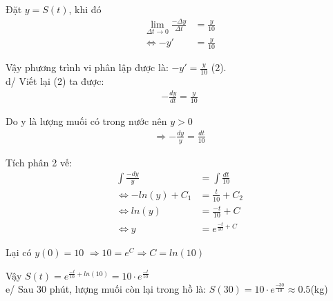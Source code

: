 \documentclass[a4paper,12pt]{report}
\begin{document}
Đặt $y = S(t)$, khi đó
\begin{align*}
    \lim_{\Delta t \to 0} \frac{- \Delta y}{\Delta t} &= \frac{y}{10}\\
    \Longleftrightarrow -y' &= \frac{y}{10}
\end{align*}

Vậy phương trình vi phân lập được là: $-y' = \frac{y}{10}$ (2).
\\
d/ Viết lại (2) ta được:
\begin{align*}
    -\frac{dy}{dt} = \frac{y}{10}
\end{align*}

Do y là lượng muối có trong nước nên $y > 0$
\begin{align*}
    \Longrightarrow -\frac{dy}{y} = \frac{dt}{10}
\end{align*}

Tích phân 2 vế:
\begin{align*}
    \int\frac{-dy}{y} &= \int\frac{dt}{10}\\
    \Longleftrightarrow -ln(y) + C_1 &= \frac{t}{10} + C_2\\
    \Longleftrightarrow ln(y) &= \frac{-t}{10} + C\\
    \Longleftrightarrow y &= e^{\frac{-t}{10} + C}
\end{align*}

Lại có $y(0) = 10$ $\Longrightarrow 10 = e^{C} \Longrightarrow C = ln(10)$ 

Vậy $S(t) = e^{\frac{-t}{10} + ln(10)} = 10 \cdot e^{\frac{-t}{10}}$
\\
e/ Sau 30 phút, lượng muối còn lại trong hồ là: $S(30) = 10 \cdot e^{\frac{-30}{10}} \approx 0.5$(kg)
\end{document}
